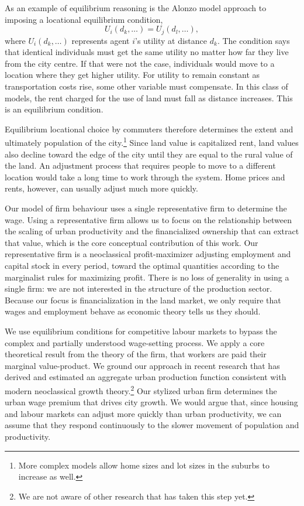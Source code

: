As an example of \gls{equilibrium reasoning} is the \Gls{Alonzo model} approach to imposing a locational equilibrium condition,
\[U_i(d_k,\dots)=U_j(d_l, \dots),\]where $U_i(d_k,\dots)$ represents agent $i$'s utility at distance $d_k$. 
The condition says that identical individuals must get the same utility no matter how far they live from the city centre. If that were not the case, individuals would move to a location where they get higher utility. For utility to remain constant as transportation costs rise, some other variable must compensate. In this class of models, the rent charged for the use of land must fall as distance increases.
This is an equilibrium condition. 

Equilibrium locational choice by commuters therefore determines the extent and ultimately population of the city.\footnote{More complex models allow home sizes and lot sizes in the suburbs to increase as well.} Since land value is \gls{capitalize}d rent, land values also decline toward the edge of the city until they are equal to the rural value of the land. 
An adjustment process that requires people to move to a different location would take a long time to work through the system. Home prices and rents, however, can usually adjust much more quickly. 

Our model of firm behaviour uses a single representative firm to determine the wage.  Using a representative firm allows us to focus on the relationship between the scaling of urban productivity and the financialized ownership that can extract that value, which is the core conceptual contribution of this work. Our representative firm is a neoclassical profit-maximizer adjusting employment and capital stock in every period, toward the optimal quantities according to the marginalist rules for maximizing profit. There is no loss of generality in using a single firm: we are not interested in the structure of the production sector. Because our focus is financialization in the land market, we only require that wages and employment behave as economic theory tells us they should. 

 We use equilibrium conditions for competitive labour markets to bypass the complex and partially understood wage-setting process. We apply a core theoretical result from the theory of the firm, that workers are paid their \gls{marginal value-product}. We ground our approach in recent research that has derived and estimated an aggregate urban production function consistent with modern \gls{neoclassical growth theory}.\footnote{We are not aware of other research that has taken this step yet.} Our stylized urban firm determines the urban wage premium that drives city growth. We would argue that, since housing and labour markets can adjust more quickly than urban productivity, we can assume that they respond continuously to the slower movement of population and productivity. %


